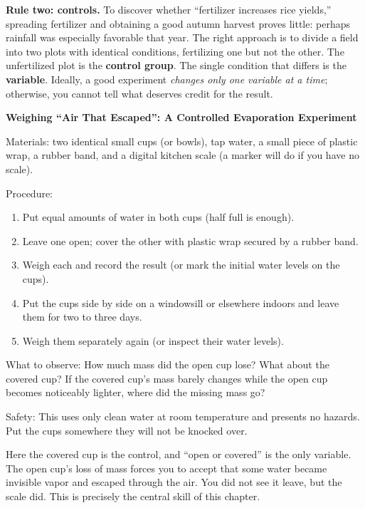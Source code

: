 \textbf{Rule two: controls.} To discover whether ``fertilizer increases rice yields,'' spreading fertilizer and obtaining a good autumn harvest proves little: perhaps rainfall was especially favorable that year. The right approach is to divide a field into two plots with identical conditions, fertilizing one but not the other. The unfertilized plot is the \textbf{control group}. The single condition that differs is the \textbf{variable}. Ideally, a good experiment \emph{changes only one variable at a time}; otherwise, you cannot tell what deserves credit for the result.

\begin{shiyan}
\textbf{Weighing ``Air That Escaped'': A Controlled Evaporation Experiment}

Materials: two identical small cups (or bowls), tap water, a small piece of plastic wrap, a rubber band, and a digital kitchen scale (a marker will do if you have no scale).

Procedure:
\begin{enumerate}[itemsep=1pt]
\item Put equal amounts of water in both cups (half full is enough).
\item Leave one open; cover the other with plastic wrap secured by a rubber band.
\item Weigh each and record the result (or mark the initial water levels on the cups).
\item Put the cups side by side on a windowsill or elsewhere indoors and leave them for two to three days.
\item Weigh them separately again (or inspect their water levels).
\end{enumerate}

What to observe: How much mass did the open cup lose? What about the covered cup? If the covered cup's mass barely changes while the open cup becomes noticeably lighter, where did the missing mass go?

Safety: This uses only clean water at room temperature and presents no hazards. Put the cups somewhere they will not be knocked over.

Here the covered cup is the control, and ``open or covered'' is the only variable. The open cup's loss of mass forces you to accept that some water became invisible vapor and escaped through the air. You did not see it leave, but the scale did. This is precisely the central skill of this chapter.
\end{shiyan}

